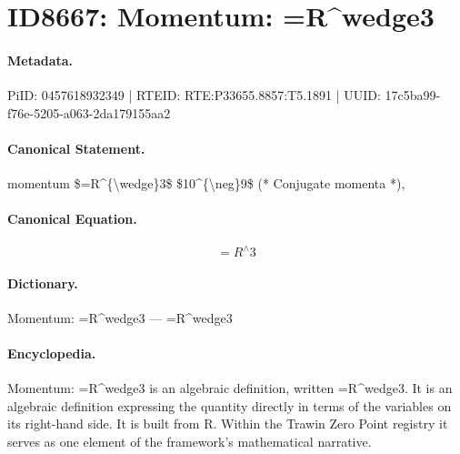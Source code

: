 \section*{ID8667: Momentum: =R\textasciicircum{}wedge3}
\paragraph{Metadata.}
PiID: 0457618932349 | RTEID: RTE:P33655.8857:T5.1891 | UUID: 17c5ba99-f76e-5205-a063-2da179155aa2

\paragraph{Canonical Statement.}
momentum \$=R\textasciicircum{}\{\textbackslash{}wedge\}3\$ \$10\textasciicircum{}\{\textbackslash{}neg\}9\$ (* Conjugate momenta *),

\paragraph{Canonical Equation.}
\[
=R^{\wedge}3
\]

\paragraph{Dictionary.}
Momentum: =R\textasciicircum{}wedge3 — =R\textasciicircum{}wedge3

\paragraph{Encyclopedia.}
Momentum: =R\textasciicircum{}wedge3 is an algebraic definition, written =R\textasciicircum{}wedge3. It is an algebraic definition expressing the quantity directly in terms of the variables on its right-hand side. It is built from R. Within the Trawin Zero Point registry it serves as one element of the framework's mathematical narrative.
